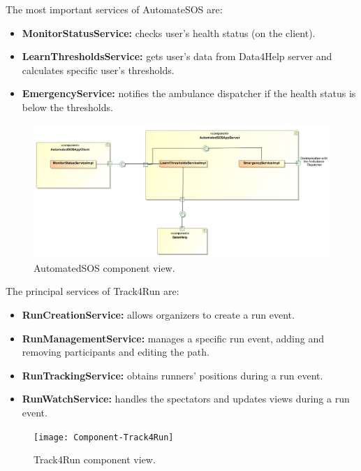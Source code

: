 \documentclass[a4paper]{article}
\begin{document}
\noindent The most important services of AutomateSOS are:
\begin{itemize}    
    \item \textbf{MonitorStatusService:} checks user's health status (on the client).
    \item \textbf{LearnThresholdsService:} gets user's data from Data4Help server and calculates specific user's thresholds.
    \item \textbf{EmergencyService:} notifies the ambulance dispatcher if the health status is below the thresholds.
\end{itemize}


\begin{figure}[H]
    \centering
    \includegraphics[width=\linewidth]{ComponentAutomatedSOS}
    \caption{AutomatedSOS component view.}
    \label{fig:my_label}
\end{figure}

\vspace{.5cm}
\noindent The principal services of Track4Run are:
\begin{itemize}    
    \item \textbf{RunCreationService:} allows organizers to create a run event.
    \item \textbf{RunManagementService:} manages a specific run event, adding and removing participants and editing the path.
    \item \textbf{RunTrackingService:} obtains runners' positions during a run event.
    \item \textbf{RunWatchService:} handles the spectators and updates views during a run event.
\end{itemize}

\begin{figure}[H]
    \centering
    \texttt{[image: Component-Track4Run]}
    \caption{Track4Run component view.}
    \label{fig:my_label}
\end{figure}
\end{document}
